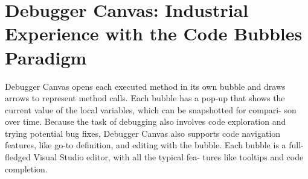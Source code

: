 \section{Debugger Canvas: Industrial Experience with the Code Bubbles Paradigm}



Debugger Canvas opens each executed method in its own bubble and draws arrows to represent method calls. Each bubble has a pop-up that shows the current value of the local variables, which can be snapshotted for compari- son over time. Because the task of debugging also involves code exploration and trying potential bug fixes, Debugger Canvas also supports code navigation features, like go-to definition, and editing with the bubble. Each bubble is a full-fledged Visual Studio editor, with all the typical fea- tures like tooltips and code completion.


